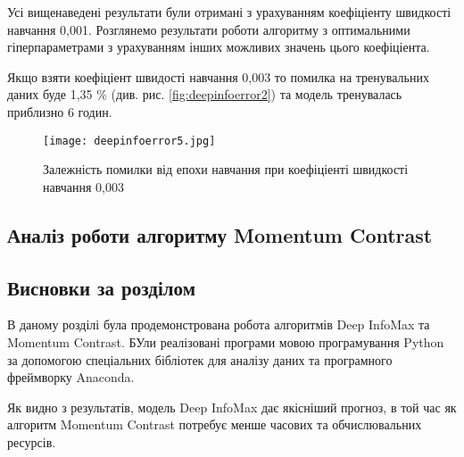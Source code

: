 Усі вищенаведені результати були отримані з урахуванням коефіціенту швидкості навчання 0,001. Розглянемо результати роботи алгоритму з оптимальними гіперпараметрами з урахуванням інших можливих значень цього коефіціента.

Якщо взяти коефіціент швидості навчання 0,003 то помилка на тренувальних даних буде 1,35 \% (див. рис. \ref{fig:deepinfoerror2}) та модель тренувалась приблизно 6 годин.

\vspace{1em}

\begin{figure}[h]
  \texttt{[image: deepinfoerror5.jpg]}
  \caption{Залежність помилки від епохи навчання при коефіціенті швидкості навчання 0,003}
  \label{fig:deepinfoerror5}
\end{figure}



\subsection{Аналіз роботи алгоритму Momentum Contrast}




\subsection{Висновки за розділом}

В даному розділі була продемонстрована робота алгоритмів Deep InfoMax та Momentum Contrast. БУли реалізовані програми мовою програмування Python за допомогою спеціальних бібліотек для аналізу даних та програмного фреймворку Anaconda. 

Як видно з результатів, модель Deep InfoMax дає якісніший прогноз, в той час як алгоритм Momentum Contrast потребує менше часових та обчислювальних ресурсів.

